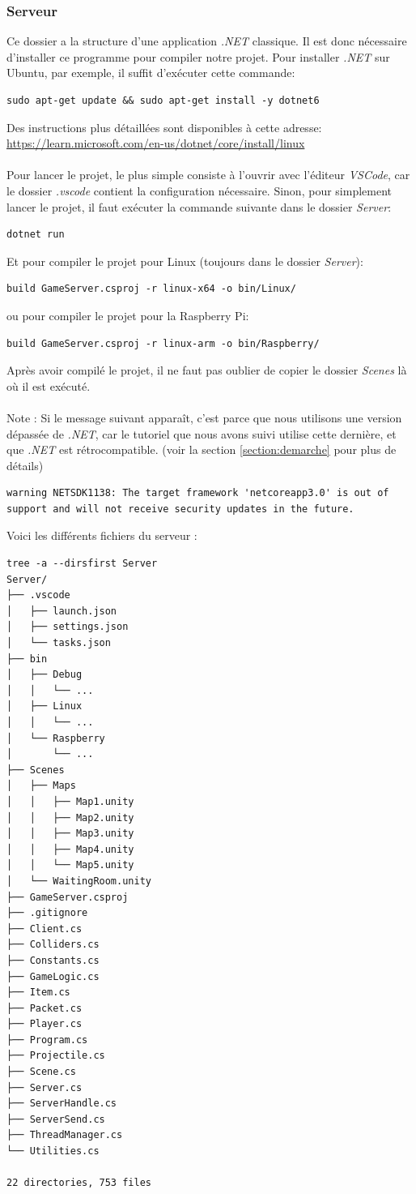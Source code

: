 \documentclass[a4paper]{article}
\begin{document}
\subsubsection{Serveur}
Ce dossier a la structure d’une application \textit{.NET} classique. Il est donc nécessaire d'installer ce programme pour compiler notre projet. 
Pour installer \textit{.NET} sur Ubuntu, par exemple, il suffit d'exécuter cette commande:
\begin{verbatim}
sudo apt-get update && sudo apt-get install -y dotnet6
\end{verbatim}
Des instructions plus détaillées sont disponibles à cette adresse: \\
\url{https://learn.microsoft.com/en-us/dotnet/core/install/linux} \\
\\
Pour lancer le projet, le plus simple consiste à l'ouvrir avec l'éditeur \textit{VSCode}, car le dossier \mbox{\emph{.vscode}} contient la configuration nécessaire. Sinon, pour simplement lancer le projet, il faut exécuter la commande suivante dans le dossier \emph{Server}:
\begin{verbatim}
dotnet run
\end{verbatim}
Et pour compiler le projet pour Linux (toujours dans le dossier \emph{Server}):
\begin{verbatim}
build GameServer.csproj -r linux-x64 -o bin/Linux/
\end{verbatim}
ou pour compiler le projet pour la Raspberry Pi:
\begin{verbatim}
build GameServer.csproj -r linux-arm -o bin/Raspberry/
\end{verbatim}
Après avoir compilé le projet, il ne faut pas oublier de copier le dossier \emph{Scenes} là où il est exécuté.\\
\\
Note : Si le message suivant apparaît, c'est parce que nous utilisons une version dépassée de \textit{.NET}, car le tutoriel que nous avons suivi utilise cette dernière, et que \textit{.NET} est rétrocompatible. (voir la section \ref{section:demarche} pour plus de détails)
\begin{verbatim}
warning NETSDK1138: The target framework 'netcoreapp3.0' is out of support and will not receive security updates in the future.
\end{verbatim}
Voici les différents fichiers du serveur :
\begin{verbatim}
tree -a --dirsfirst Server
Server/
├── .vscode
│   ├── launch.json
│   ├── settings.json
│   └── tasks.json
├── bin
│   ├── Debug
│   │   └── ...
│   ├── Linux
│   │   └── ...
│   └── Raspberry
│       └── ...
├── Scenes
│   ├── Maps
│   │   ├── Map1.unity
│   │   ├── Map2.unity
│   │   ├── Map3.unity
│   │   ├── Map4.unity
│   │   └── Map5.unity
│   └── WaitingRoom.unity
├── GameServer.csproj
├── .gitignore
├── Client.cs
├── Colliders.cs
├── Constants.cs
├── GameLogic.cs
├── Item.cs
├── Packet.cs
├── Player.cs
├── Program.cs
├── Projectile.cs
├── Scene.cs
├── Server.cs
├── ServerHandle.cs
├── ServerSend.cs
├── ThreadManager.cs
└── Utilities.cs 

22 directories, 753 files
\end{verbatim}
\end{document}
